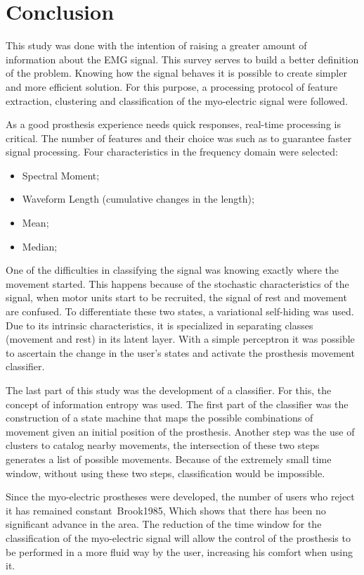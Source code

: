 \documentclass[a4paper, 12pt]{ppgeb}
\begin{document}
\chapter{Conclusion}\label{chap:Conclusao}

This study was done with the intention of raising a greater amount of information about the \ac{EMG} signal. This survey serves to build a better definition of the problem. Knowing how the signal behaves it is possible to create simpler and more efficient solution. For this purpose, a processing protocol of feature extraction, clustering and classification of the myo-electric signal were followed.

As a good prosthesis experience needs quick responses, real-time processing is critical. The number of features and their choice was such as to guarantee faster signal processing. Four characteristics in the frequency domain were selected: 
\begin{itemize}
    \item Spectral Moment;
    \item Waveform Length (cumulative changes in the length);
    \item Mean;
    \item Median;
\end{itemize}

One of the difficulties in classifying the signal was knowing exactly where the movement started. This happens because of the stochastic characteristics of the signal, when motor units start to be recruited, the signal of rest and movement are confused. To differentiate these two states, a variational self-hiding was used. Due to its intrinsic characteristics, it is specialized in separating classes (movement and rest) in its latent layer. With a simple perceptron it was possible to ascertain the change in the user's states and activate the prosthesis movement classifier.

The last part of this study was the development of a classifier. For this, the concept of information entropy was used. The first part of the classifier was the construction of a state machine that maps the possible combinations of movement given an initial position of the prosthesis. Another step was the use of clusters to catalog nearby movements, the intersection of these two steps generates a list of possible movements. Because of the extremely small time window, without using these two steps, classification would be impossible.

Since the myo-electric prostheses were developed, the number of users who reject it has remained constant~\cite{mainreferences}{Brook1985}, Which shows that there has been no significant advance in the area. The reduction of the time window for the classification of the myo-electric signal will allow the control of the prosthesis to be performed in a more fluid way by the user, increasing his comfort when using it.
\end{document}
